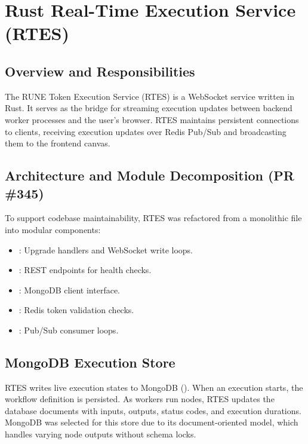 \documentclass[12pt]{report}
\begin{document}
\chapter{Rust Real-Time Execution Service (RTES)}
\label{ch:rtes}

\section{Overview and Responsibilities}
The RUNE Token Execution Service (RTES) is a WebSocket service written in Rust. It serves as the bridge for streaming execution updates between backend worker processes and the user's browser. RTES maintains persistent connections to clients, receiving execution updates over Redis Pub/Sub and broadcasting them to the frontend canvas.

\section{Architecture and Module Decomposition (PR \#345)}
To support codebase maintainability, RTES was refactored from a monolithic file into modular components:
\begin{itemize}
    \item {}: Upgrade handlers and WebSocket write loops.
    \item {}: REST endpoints for health checks.
    \item {}: MongoDB client interface.
    \item {}: Redis token validation checks.
    \item {}: Pub/Sub consumer loops.
\end{itemize}

\section{MongoDB Execution Store}
RTES writes live execution states to MongoDB (). When an execution starts, the workflow definition is persisted. As workers run nodes, RTES updates the database documents with inputs, outputs, status codes, and execution durations. MongoDB was selected for this store due to its document-oriented model, which handles varying node outputs without schema locks.
\end{document}
